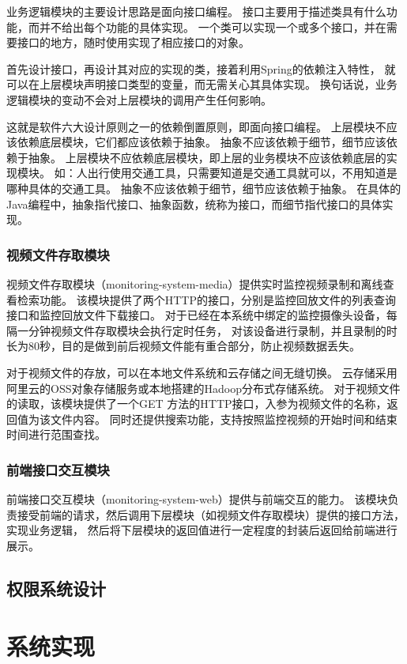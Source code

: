 业务逻辑模块的主要设计思路是面向接口编程。
接口主要用于描述类具有什么功能，而并不给出每个功能的具体实现。
一个类可以实现一个或多个接口，并在需要接口的地方，随时使用实现了相应接口的对象。

首先设计接口，再设计其对应的实现的类，接着利用Spring的依赖注入特性，
就可以在上层模块声明接口类型的变量，而无需关心其具体实现。
换句话说，业务逻辑模块的变动不会对上层模块的调用产生任何影响。

这就是软件六大设计原则之一的依赖倒置原则，即面向接口编程。
上层模块不应该依赖底层模块，它们都应该依赖于抽象。
抽象不应该依赖于细节，细节应该依赖于抽象。
上层模块不应依赖底层模块，即上层的业务模块不应该依赖底层的实现模块。
如：人出行使用交通工具，只需要知道是交通工具就可以，不用知道是哪种具体的交通工具。
抽象不应该依赖于细节，细节应该依赖于抽象。
在具体的Java编程中，抽象指代接口、抽象函数，统称为接口，而细节指代接口的具体实现。

\subsection{视频文件存取模块}
视频文件存取模块（monitoring-system-media）提供实时监控视频录制和离线查看检索功能。
该模块提供了两个HTTP的接口，分别是监控回放文件的列表查询接口和监控回放文件下载接口。
对于已经在本系统中绑定的监控摄像头设备，每隔一分钟视频文件存取模块会执行定时任务，
对该设备进行录制，并且录制的时长为80秒，目的是做到前后视频文件能有重合部分，防止视频数据丢失。

对于视频文件的存放，可以在本地文件系统和云存储之间无缝切换。
云存储采用阿里云的OSS对象存储服务或本地搭建的Hadoop分布式存储系统。
对于视频文件的读取，该模块提供了一个GET 方法的HTTP接口，入参为视频文件的名称，返回值为该文件内容。
同时还提供搜索功能，支持按照监控视频的开始时间和结束时间进行范围查找。


\subsection{前端接口交互模块}
前端接口交互模块（monitoring-system-web）提供与前端交互的能力。
该模块负责接受前端的请求，然后调用下层模块（如视频文件存取模块）提供的接口方法，实现业务逻辑，
然后将下层模块的返回值进行一定程度的封装后返回给前端进行展示。





\section{权限系统设计}



























\chapter{系统实现}
